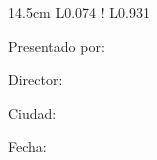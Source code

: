 {\begin{titlepage}
\begin{table}[h!]
\begin{tabularx}{14.5cm}{ L{0.074} !{\color{azul}\vline}  L{0.931} }
            \end{tabularx}
        \end{table}
        \vspace{0.5cm}
        {\flushleft \fontsize{11}{11}\selectfont %
            \georgiab \tipoTesisv\par
                \vspace{0.5cm}
                Presentado por: \georgiamd \autorv \par
                \vspace{0.5cm}
                \georgiab Director: \georgiamd \directorv \par
                \vspace{1cm}
                {\color{azul}%
                \georgiab Ciudad: \georgiamd \ciudadv \par
                \georgiab Fecha: \georgiamd \fechav \par}
        }
    \end{titlepage}}